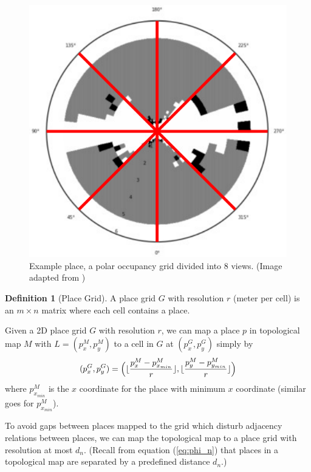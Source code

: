 \documentclass[10pt, titlepage]{article}
\theoremstyle{definition}
\newtheorem{definition}{Definition}[section]
\DeclarePairedDelimiter\floor{\lfloor}{\rfloor}
\begin{document}
\begin{figure}[!htb]
    \centering
    \captionsetup{width=.5\linewidth}
    \includegraphics[scale=0.15]{images/polar_grid.png}
    \caption{Example place, a polar occupancy grid divided into 8 views. (Image adapted from \cite{pronobis2016learning})}
    \label{fig:place}
\end{figure}

\begin{definition}[Place Grid]
A place grid $G$ with resolution $r$ (meter per cell) is an $m\times n$ matrix where each cell contains a place.
\end{definition}

Given a 2D place grid $G$ with resolution $r$, we can map a place $p$ in topological map $M$ with $L=(p_x^M, p_y^M)$ to a cell in $G$ at $(p_x^G, p_y^G)$ simply by
\begin{equation}
  (p_x^G, p_y^G) = \Big(\floor{\frac{p_x^M-p_{x_{min}}^M}{r}}, \floor{\frac{p_y^M-p_{y_{min}}^M}{r}}\Big)
\end{equation}
where $p_{x_{min}}^M$ is the $x$ coordinate for the place with minimum $x$ coordinate (similar goes for $p_{x_{min}}^M$).

To avoid gaps between places mapped to the grid which disturb adjacency relations between places, we can map the topological map to a place grid with resolution at most $d_n$. (Recall from equation (\ref{eq:phi_n}) that places in a topological map are separated by a predefined distance $d_n$.)\label{sc:avoidgaps}
\end{document}
